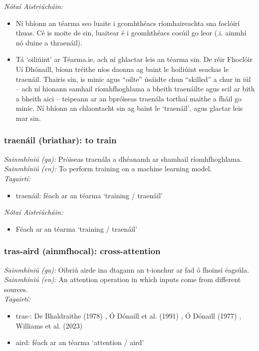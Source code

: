  \noindent \textit{Nótaí Aistriúcháin:}
\begin{itemize}
	\item Ní bhíonn an téarma seo luaite i gcomhthéacs ríomhaireachta sna foclóirí thuas. Cé is moite de sin, luaitear é i gcomhthéacs cosúil go leor (.i. ainmhí nó duine a thraenáil).
	\item Tá `oiliúint' ar Téarma.ie, ach ní ghlactar leis an téarma sin. De réir Fhoclóir Uí Dhónaill, bíonn tréithe níos daonna ag baint le hoiliúint seachas le traenáil. Thairis sin, is minic agus “oilte” úsáidte chun “skilled” a chur in iúl -- ach ní hionann samhail ríomhfhoghlama a bheith traenáilte agus scil ar bith a bheith aici -- teipeann ar an bpróiseas traenála torthaí maithe a fháil go minic. Ní bhíonn an chlaontacht sin ag baint le `traenáil', agus glactar leis mar sin.
\end{itemize}


\subsubsection*{traenáil (briathar): to train}
 \noindent \textit{Sainmhíniú (ga):} Próiseas traenála a dhéanamh ar shamhail ríomhfhoghlama.
\\
 \noindent \textit{Sainmhíniú (en):} To perform training on a machine learning model.
\\
 \noindent \textit{Tagairtí:}
\begin{itemize}
	\item traenáil: féach ar an téarma `training / traenáil'
\end{itemize}

 \noindent \textit{Nótaí Aistriúcháin:}
\begin{itemize}
	\item Féach ar an téarma `training / traenáil'
\end{itemize}


\subsubsection*{tras-aird (ainmfhocal): cross-attention}
 \noindent \textit{Sainmhíniú (ga):} Oibriú airde ina dtagann an t-ionchur ar fad ó fhoinsí éagsúla.
\\
 \noindent \textit{Sainmhíniú (en):} An attention operation in which inputs come from different sources.
\\
 \noindent \textit{Tagairtí:}
\begin{itemize}
	\item tras-: De Bhaldraithe (1978) \cite{de-bhaldraithe}, Ó Dónaill et al. (1991) \cite{focloir-beag}, Ó Dónaill (1977) \cite{odonaill}, Williams et al. (2023) \cite{storchiste}
	\item aird: féach ar an téarma `attention / aird'
\end{itemize}

